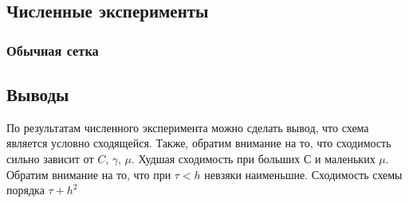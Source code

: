 \subsection{Численные эксперименты}
\subsubsection{Обычная сетка}




\newpage




\newpage



\newpage



\newpage



\newpage



\newpage



\newpage



\newpage



\newpage



\newpage



\newpage



\newpage


\subsection{Выводы}
По результатам численного эксперимента можно сделать вывод, что схема является условно сходящейся. Также, обратим внимание на то, что сходимость сильно зависит от $C$, $\gamma$, $\mu$. Худшая сходимость при больших $С$ и маленьких $\mu$. Обратим внимание на то, что при $\tau < h$ невзяки наименьшие. Сходимость схемы порядка $\tau + h^2$

